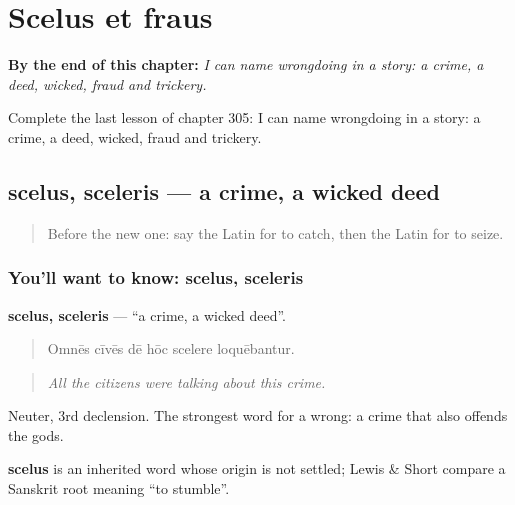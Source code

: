 
\chapter{Scelus et fraus}
\label{ch:la-scelus-et-fraus}

\begin{chapteropening}
\textbf{By the end of this chapter:} \emph{I can name wrongdoing in a story: a crime, a deed, wicked, fraud and trickery.}

Complete the last lesson of chapter 305: I can name wrongdoing in a story: a crime, a deed, wicked, fraud and trickery.
\end{chapteropening}

\section[scelus, sceleris]{scelus, sceleris — a crime, a wicked deed}

\label{lesson:LA-C305-scelus}



\begin{quote}
Before the new one: say the Latin for to catch, then the Latin for to seize.
\end{quote}

\subsection*{You'll want to know: scelus, sceleris}
\textbf{scelus, sceleris} — \textquotedblleft{}a crime, a wicked deed\textquotedblright{}.

\begin{quote}
Omnēs cīvēs dē hōc scelere loquēbantur.
\end{quote}

\begin{quote}
\emph{All the citizens were talking about this crime.}
\end{quote}

Neuter, 3rd declension. The strongest word for a wrong: a crime that also offends the gods.

\begin{cousinweb}
\textbf{scelus} is an inherited word whose origin is not settled; Lewis \& Short compare a Sanskrit root meaning \textquotedblleft{}to stumble\textquotedblright{}.
\end{cousinweb}

